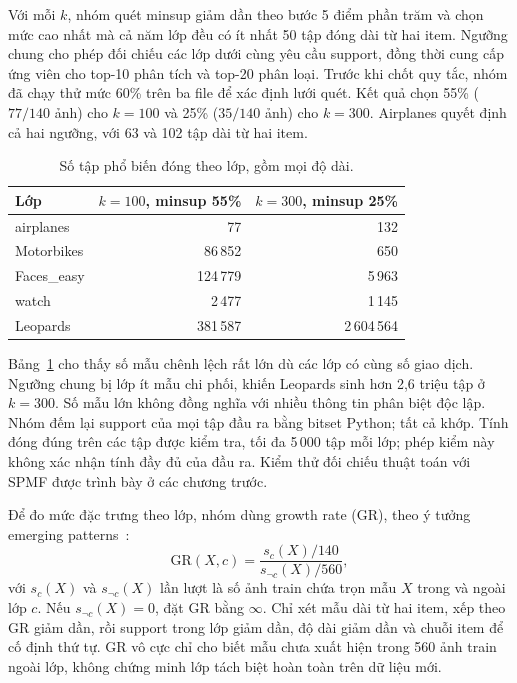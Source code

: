 Với mỗi $k$, nhóm quét minsup giảm dần theo bước 5 điểm phần trăm và chọn mức cao nhất mà cả năm lớp đều
có ít nhất 50 tập đóng dài từ hai item. Ngưỡng chung cho phép đối chiếu các lớp dưới cùng yêu cầu support,
đồng thời cung cấp ứng viên cho top-10 phân tích và top-20 phân loại. Trước khi chốt quy tắc, nhóm đã chạy
thử mức 60\% trên ba file để xác định lưới quét. Kết quả chọn 55\% ($77/140$ ảnh) cho $k=100$ và 25\%
($35/140$ ảnh) cho $k=300$. Airplanes quyết định cả hai ngưỡng, với 63 và 102 tập dài từ hai item.

\begin{table}[!t]
\centering
\caption{Số tập phổ biến đóng theo lớp, gồm mọi độ dài.}
\label{tab:app2-counts}
\footnotesize
\begin{tabular}{lrr}\hline
Lớp & $k=100$, minsup 55\% & $k=300$, minsup 25\%\\\hline
airplanes & 77 & 132\\
Motorbikes & 86\,852 & 650\\
Faces\_easy & 124\,779 & 5\,963\\
watch & 2\,477 & 1\,145\\
Leopards & 381\,587 & 2\,604\,564\\\hline
\end{tabular}
\end{table}

Bảng~\ref{tab:app2-counts} cho thấy số mẫu chênh lệch rất lớn dù các lớp có cùng số giao dịch. Ngưỡng chung
bị lớp ít mẫu chi phối, khiến Leopards sinh hơn 2,6 triệu tập ở $k=300$. Số mẫu lớn không đồng nghĩa với
nhiều thông tin phân biệt độc lập. Nhóm đếm lại support của mọi tập đầu ra bằng bitset Python; tất cả
khớp. Tính đóng đúng trên các tập được kiểm tra, tối đa 5\,000 tập mỗi lớp; phép kiểm này không xác nhận
tính đầy đủ của đầu ra. Kiểm thử đối chiếu thuật toán với SPMF được trình bày ở các chương trước.

Để đo mức đặc trưng theo lớp, nhóm dùng growth rate (GR), theo ý tưởng emerging patterns~\cite{dong1999}:
\begin{equation}
\mathrm{GR}(X,c)=\frac{s_c(X)/140}{s_{\neg c}(X)/560},
\label{eq:app2-gr}
\end{equation}
với $s_c(X)$ và $s_{\neg c}(X)$ lần lượt là số ảnh train chứa trọn mẫu $X$ trong và ngoài lớp $c$.
Nếu $s_{\neg c}(X)=0$, đặt GR bằng $\infty$. Chỉ xét mẫu dài từ hai item, xếp theo GR giảm dần, rồi support
trong lớp giảm dần, độ dài giảm dần và chuỗi item để cố định thứ tự. GR vô cực chỉ cho biết mẫu chưa xuất
hiện trong 560 ảnh train ngoài lớp, không chứng minh lớp tách biệt hoàn toàn trên dữ liệu mới.


